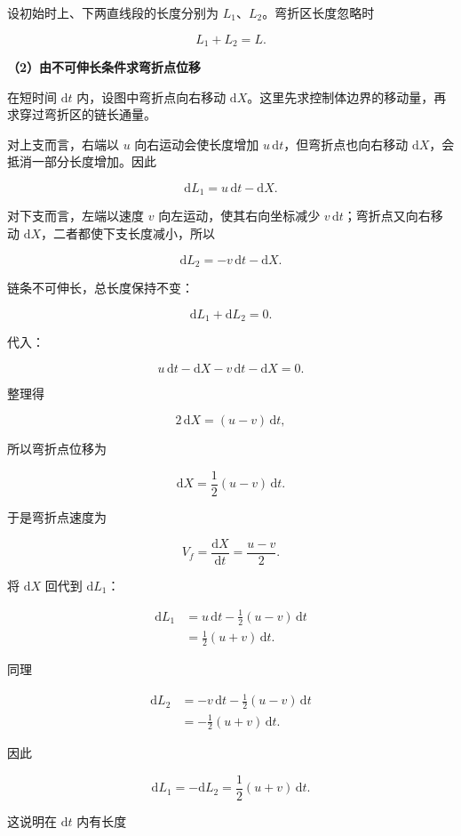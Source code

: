 \documentclass[12pt,a4paper,UTF8]{ctexart}
\begin{document}
设初始时上、下两直线段的长度分别为 \(L_1\)、\(L_2\)。弯折区长度忽略时

\[L_1+L_2=L.\]

\textbf{（2）由不可伸长条件求弯折点位移}

在短时间 \(\mathrm{d}t\) 内，设图中弯折点向右移动
\(\mathrm{d}X\)。这里先求控制体边界的移动量，再求穿过弯折区的链长通量。

对上支而言，右端以 \(u\) 向右运动会使长度增加
\(u\,\mathrm{d}t\)，但弯折点也向右移动
\(\mathrm{d}X\)，会抵消一部分长度增加。因此

\[
\mathrm{d}L_1=u\,\mathrm{d}t-\mathrm{d}X.
\]

对下支而言，左端以速度 \(v\) 向左运动，使其右向坐标减少
\(v\,\mathrm{d}t\)；弯折点又向右移动
\(\mathrm{d}X\)，二者都使下支长度减小，所以

\[
\mathrm{d}L_2=-v\,\mathrm{d}t-\mathrm{d}X.
\]

链条不可伸长，总长度保持不变：

\[\mathrm{d}L_1+\mathrm{d}L_2=0.\]

代入：

\[
u\,\mathrm{d}t-\mathrm{d}X-v\,\mathrm{d}t-\mathrm{d}X=0.
\]

整理得

\[
2\,\mathrm{d}X=(u-v)\,\mathrm{d}t,
\]

所以弯折点位移为

\[
\boxed{\mathrm{d}X=\frac12(u-v)\,\mathrm{d}t}.
\]

于是弯折点速度为

\[
\boxed{V_f=\frac{\mathrm{d}X}{\mathrm{d}t}=\frac{u-v}{2}}.
\]

将 \(\mathrm{d}X\) 回代到 \(\mathrm{d}L_1\)：

\[
\begin{aligned}
\mathrm{d}L_1
&=u\,\mathrm{d}t-\frac12(u-v)\,\mathrm{d}t\\
&=\frac12(u+v)\,\mathrm{d}t.
\end{aligned}
\]

同理

\[
\begin{aligned}
\mathrm{d}L_2
&=-v\,\mathrm{d}t-\frac12(u-v)\,\mathrm{d}t\\
&=-\frac12(u+v)\,\mathrm{d}t.
\end{aligned}
\]

因此

\[
\boxed{\mathrm{d}L_1=-\mathrm{d}L_2=\frac12(u+v)\,\mathrm{d}t}.
\]

这说明在 \(\mathrm{d}t\) 内有长度
\end{document}
